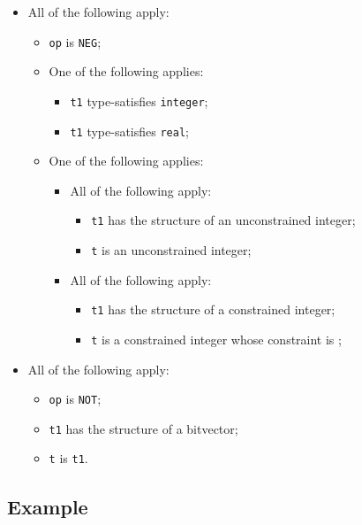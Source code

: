 \documentclass{book}
\begin{document}
\begin{itemize}
  \item All of the following apply:
    \begin{itemize}
    \item \texttt{op} is \texttt{NEG};
    \item One of the following applies:
      \begin{itemize}
      \item \texttt{t1} type-satisfies \texttt{integer};
      \item \texttt{t1} type-satisfies \texttt{real};
      \end{itemize}
     \item One of the following applies:
       \begin{itemize}
       \item All of the following apply:
         \begin{itemize}
         \item \texttt{t1} has the structure of an unconstrained integer;
         \item \texttt{t} is an unconstrained integer;
         \end{itemize}
       \item All of the following apply:
         \begin{itemize}
         \item \texttt{t1} has the structure of a constrained integer;
         \item \texttt{t} is a constrained integer whose constraint is ;
         \end{itemize}
       \end{itemize}
    \end{itemize}

  \item All of the following apply:
    \begin{itemize}
    \item \texttt{op} is \texttt{NOT};
    \item \texttt{t1} has the structure of a bitvector;
    \item \texttt{t} is \texttt{t1}.
    \end{itemize}
  \end{itemize}

  \subsection{Example}


\end{document}
